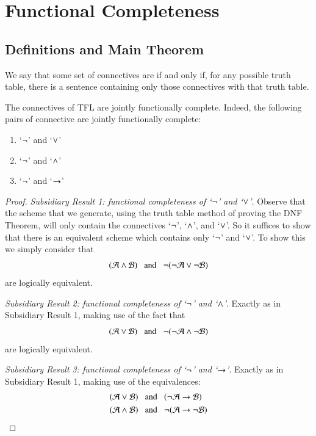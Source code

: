 \documentclass[12pt, a4paper, oneside, openright, titlepage]{book}
\begin{document}
\chapter{\textsection\textsection Functional Completeness}

\section{\textsection Definitions and Main Theorem}

\begin{defn}
    We say that some set of connectives are  if and only if, for any possible truth table, there is a sentence containing only those connectives with that truth table.
\end{defn}

\begin{namthm}
    The connectives of TFL are jointly functionally complete. Indeed, the following pairs of connective are jointly functionally complete: \begin{enumerate}
        \item `$\neg$' and `$\vee$'
        \item `$\neg$' and `$\wedge$'
        \item `$\neg$' and `$\rightarrow$'
    \end{enumerate}
\end{namthm}
\begin{proof}
    \emph{Subsidiary Result 1: functional completeness of `$\neg$' and `$\vee$'}. Observe that the scheme that we generate, using the truth table method of proving the DNF Theorem, will only contain the connectives `$\neg$', `$\wedge$', and `$\vee$'. So it suffices to show that there is an equivalent scheme which contains only `$\neg$' and `$\vee$'. To show this we simply consider that \begin{equation*}
        (\mathcal{A}\wedge\mathcal{B}) \;\;\text{ and }\;\;\neg(\neg\mathcal{A}\vee\neg\mathcal{B})
    \end{equation*}
    are logically equivalent.

    \emph{Subsidiary Result 2: functional completeness of `$\neg$' and `$\wedge$'}. Exactly as in Subsidiary Result 1, making use of the fact that \begin{equation*}
        (\mathcal{A}\vee\mathcal{B}) \;\;\text{ and }\;\;\neg(\neg\mathcal{A}\wedge\neg\mathcal{B})
    \end{equation*}
    are logically equivalent.

    \emph{Subsidiary Result 3: functional completeness of `$\neg$' and `$\rightarrow$'}. Exactly as in Subsidiary Result 1, making use of the equivalences: \begin{align*}
        (\mathcal{A}\vee\mathcal{B})\;\;&\text{ and }\;\;(\neg\mathcal{A}\rightarrow \mathcal{B}) \\
        (\mathcal{A}\wedge\mathcal{B})\;\;&\text{ and }\;\;\neg(\mathcal{A}\rightarrow\neg\mathcal{B})
    \end{align*}
\end{proof}
\end{document}
